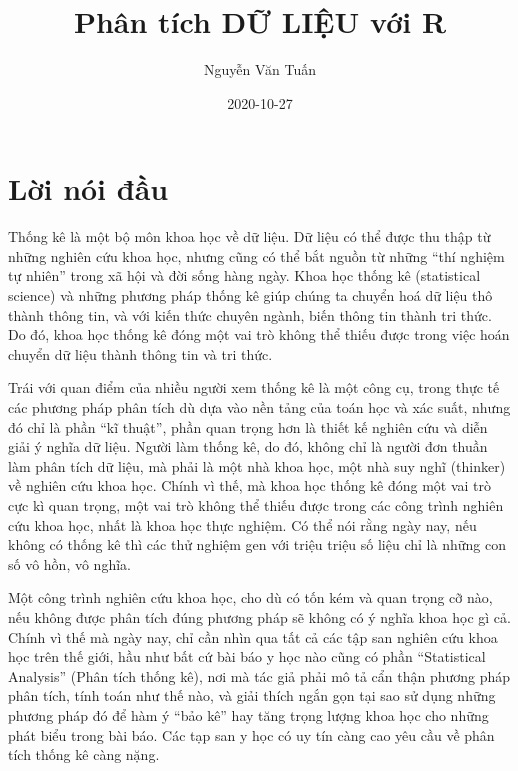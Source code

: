 \documentclass[
]{book}
\title{Phân tích DỮ LIỆU với R}
\author{Nguyễn Văn Tuấn}
\date{2020-10-27}
\begin{document}
\maketitle

{
\hypersetup{linkcolor=}
\setcounter{tocdepth}{1}
\tableofcontents
}
\hypertarget{lux1eddi-nuxf3i-ux111ux1ea7u}{%
\chapter*{Lời nói đầu}\label{lux1eddi-nuxf3i-ux111ux1ea7u}}

Thống kê là một bộ môn khoa học về dữ liệu. Dữ liệu có thể được thu thập từ những nghiên cứu khoa học, nhưng cũng có thể bắt nguồn từ những ``thí nghiệm tự nhiên'' trong xã hội và đời sống hàng ngày. Khoa học thống kê (statistical science) và những phương pháp thống kê giúp chúng ta chuyển hoá dữ liệu thô thành thông tin, và với kiến thức chuyên ngành, biến thông tin thành tri thức. Do đó, khoa học thống kê đóng một vai trò không thể thiếu được trong việc hoán chuyển dữ liệu thành thông tin và tri thức.

Trái với quan điểm của nhiều người xem thống kê là một công cụ, trong thực tế các phương pháp phân tích dù dựa vào nền tảng của toán học và xác suất, nhưng đó chỉ là phần ``kĩ thuật'', phần quan trọng hơn là thiết kế nghiên cứu và diễn giải ý nghĩa dữ liệu. Người làm thống kê, do đó, không chỉ là người đơn thuần làm phân tích dữ liệu, mà phải là một nhà khoa học, một nhà suy nghĩ (thinker) về nghiên cứu khoa học. Chính vì thế, mà khoa học thống kê đóng một vai trò cực kì quan trọng, một vai trò không thể thiếu được trong các công trình nghiên cứu khoa học, nhất là khoa học thực nghiệm. Có thể nói rằng ngày nay, nếu không có thống kê thì các thử nghiệm gen với triệu triệu số liệu chỉ là những con số vô hồn, vô nghĩa.

Một công trình nghiên cứu khoa học, cho dù có tốn kém và quan trọng cỡ nào, nếu không được phân tích đúng phương pháp sẽ không có ý nghĩa khoa học gì cả. Chính vì thế mà ngày nay, chỉ cần nhìn qua tất cả các tập san nghiên cứu khoa học trên thế giới, hầu như bất cứ bài báo y học nào cũng có phần ``Statistical Analysis'' (Phân tích thống kê), nơi mà tác giả phải mô tả cẩn thận phương pháp phân tích, tính toán như thế nào, và giải thích ngắn gọn tại sao sử dụng những phương pháp đó để hàm ý ``bảo kê'' hay tăng trọng lượng khoa học cho những phát biểu trong bài báo. Các tạp san y học có uy tín càng cao yêu cầu về phân tích thống kê càng nặng.
\end{document}
